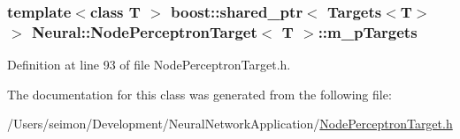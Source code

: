 \hypertarget{class_neural_1_1_node_perceptron_target_a13357af933db537d60b1c6994a27371c}{
\subsubsection[{m\_\-pTargets}]{\setlength{\rightskip}{0pt plus 5cm}template$<$class T $>$ boost::shared\_\-ptr$<$ {\bf Targets}$<$T$>$ $>$ {\bf Neural::NodePerceptronTarget}$<$ T $>$::{\bf m\_\-pTargets}}}
\label{class_neural_1_1_node_perceptron_target_a13357af933db537d60b1c6994a27371c}


Definition at line 93 of file NodePerceptronTarget.h.



The documentation for this class was generated from the following file:\begin{DoxyCompactItemize}
\item 
/Users/seimon/Development/NeuralNetworkApplication/\hyperlink{_node_perceptron_target_8h}{NodePerceptronTarget.h}\end{DoxyCompactItemize}
